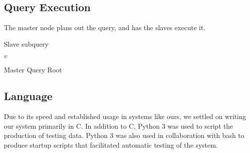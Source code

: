 \subsection{Query Execution}
The master node plans out the query, and has the slaves execute it.
\begin{algorithm}
    \begin{algorithmic}
        \Else
         \EndIf
    \end{algorithmic}
    \caption{Slave subquery}
\end{algorithm}

\begin{algorithm}
    \begin{algorithmic}
      \EndFor
      \EndFor
      \Return $v$
    \end{algorithmic}
  \caption{Master Query Root}
\end{algorithm}
\subsection{Language}
Due to its speed and established usage in systems like ours, we settled on writing our system primarily in C.
In addition to C, Python 3 was used to script the production of testing data.
Python 3 was also used in collaboration with bash to produce startup scripts that facilitated automatic testing of the system.
